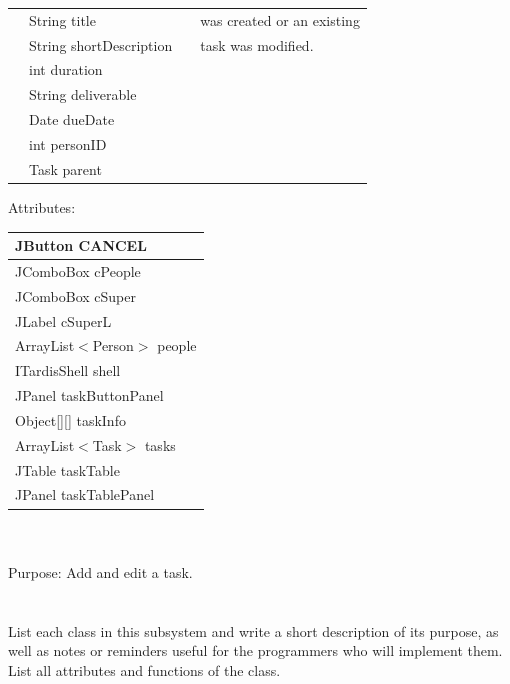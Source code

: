 \begin{tabular}{| l | l | l | l |}
		 	             & String title                     &                             & was created or an existing\\
                                                 & String shortDescription &                             & task was modified.\\
				 & int duration                   &                             & \\
				 & String deliverable          &                             &\\
		       		 & Date dueDate               &                             &\\
				 & int personID                  &                             &\\
				 & Task parent                   &                             &
\\
\hline
\end{tabular}

Attributes:\\
\begin{tabular}{| l |}
\hline
JButton CANCEL\\
\hline
JComboBox cPeople\\
\hline
JComboBox cSuper\\
\hline
JLabel cSuperL\\
\hline
ArrayList$<$Person$>$ people\\
\hline
ITardisShell shell\\
\hline
JPanel taskButtonPanel\\
\hline
Object[][] taskInfo\\
\hline
ArrayList$<$Task$>$ tasks\\
\hline
JTable taskTable\\
\hline
JPanel taskTablePanel\\
\hline
\end{tabular}\\
\\
Purpose: Add and edit a task.\\
\\
\\
List each class in this subsystem and write a short description of its purpose,
as well as notes or reminders useful for the programmers who will implement them.
List all attributes and functions of the class.